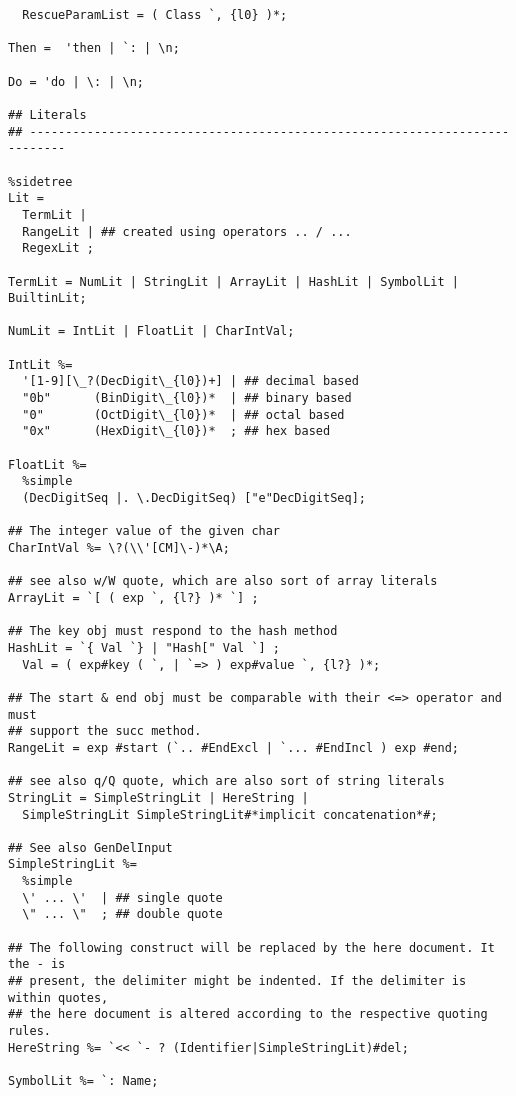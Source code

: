 \documentclass{article}
\begin{document}
\begin{verbatim}
  RescueParamList = ( Class `, {l0} )*;
  
Then =  'then | `: | \n;

Do = 'do | \: | \n;
  
## Literals
## ---------------------------------------------------------------------------
   
%sidetree              
Lit =
  TermLit |
  RangeLit | ## created using operators .. / ... 
  RegexLit ; 

TermLit = NumLit | StringLit | ArrayLit | HashLit | SymbolLit | BuiltinLit; 
                       
NumLit = IntLit | FloatLit | CharIntVal;

IntLit %=
  '[1-9][\_?(DecDigit\_{l0})+] | ## decimal based 
  "0b"      (BinDigit\_{l0})*  | ## binary based 
  "0"       (OctDigit\_{l0})*  | ## octal based 
  "0x"      (HexDigit\_{l0})*  ; ## hex based 

FloatLit %=
  %simple
  (DecDigitSeq |. \.DecDigitSeq) ["e"DecDigitSeq];
              
## The integer value of the given char
CharIntVal %= \?(\\'[CM]\-)*\A;
              
## see also w/W quote, which are also sort of array literals
ArrayLit = `[ ( exp `, {l?} )* `] ;
             
## The key obj must respond to the hash method
HashLit = `{ Val `} | "Hash[" Val `] ;
  Val = ( exp#key ( `, | `=> ) exp#value `, {l?} )*;        
              
## The start & end obj must be comparable with their <=> operator and must
## support the succ method.             
RangeLit = exp #start (`.. #EndExcl | `... #EndIncl ) exp #end; 

## see also q/Q quote, which are also sort of string literals
StringLit = SimpleStringLit | HereString |
  SimpleStringLit SimpleStringLit#*implicit concatenation*#;
              
## See also GenDelInput
SimpleStringLit %=              
  %simple              
  \' ... \'  | ## single quote
  \" ... \"  ; ## double quote
  
## The following construct will be replaced by the here document. It the - is
## present, the delimiter might be indented. If the delimiter is within quotes,
## the here document is altered according to the respective quoting rules.
HereString %= `<< `- ? (Identifier|SimpleStringLit)#del; 
  
SymbolLit %= `: Name; 
  

\end{verbatim}
\end{document}
